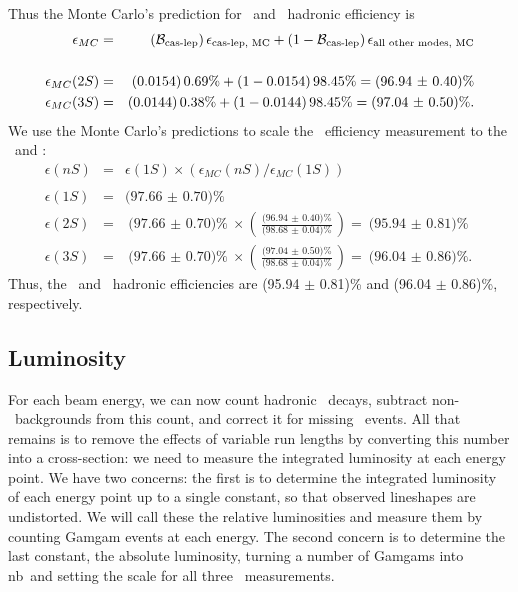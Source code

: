 \documentclass[aps,prd,preprint,superscriptaddress,tightenlines,nofootinbib,floatfix]{revtex4}
\begin{document}
Thus the Monte Carlo's prediction for \utwo\ and \uthree\ hadronic
efficiency is
\begin{eqnarray}
  \epsilon_{MC} &=& (\mathcal{B}_{\mbox{\scriptsize cas-lep}}) \, \epsilon_{\mbox{\scriptsize cas-lep, MC}}
  + (1 - \mathcal{B}_{\mbox{\scriptsize cas-lep}}) \, \epsilon_{\mbox{\scriptsize all other modes, MC}} \\
  & & \nonumber \\
  \epsilon_{MC}(2S) &=& (0.0154) \, 0.69\% + (1 - 0.0154) \, 98.45\% = \mbox{(96.94 $\pm$ 0.40)\%} \nonumber \\
  \epsilon_{MC}(3S) &=& (0.0144) \, 0.38\% + (1 - 0.0144) \, 98.45\% = \mbox{(97.04 $\pm$ 0.50)\%.} \nonumber
\end{eqnarray}
We use the Monte Carlo's predictions to scale the \uone\ efficiency
measurement to the \utwo\ and \uthree:
\begin{eqnarray}
  \epsilon(nS) &=& \epsilon(1S) \times \left(\epsilon_{MC}(nS) / \epsilon_{MC}(1S)\right) \\
  & & \nonumber \\
  \epsilon(1S) &=& \mbox{(97.66 $\pm$ 0.70)\%} \nonumber \\
  \epsilon(2S) &=& \mbox{(97.66 $\pm$ 0.70)\%} \times \left(\frac{\mbox{(96.94 $\pm$ 0.40)\%}}{\mbox{(98.68 $\pm$ 0.04)\%}}\right) = \mbox{(95.94 $\pm$ 0.81)\%} \nonumber \\
  \epsilon(3S) &=& \mbox{(97.66 $\pm$ 0.70)\%} \times \left(\frac{\mbox{(97.04 $\pm$ 0.50)\%}}{\mbox{(98.68 $\pm$ 0.04)\%}}\right) = \mbox{(96.04 $\pm$ 0.86)\%.} \nonumber
\end{eqnarray}
Thus, the \utwo\ and \uthree\ hadronic efficiencies are (95.94 $\pm$
0.81)\% and (96.04 $\pm$ 0.86)\%, respectively.

%
\subsection{Luminosity}
%

For each beam energy, we can now count hadronic \ups\ decays, subtract
non-\ups\ backgrounds from this count, and correct it for missing
\ups\ events.  All that remains is to remove the effects of variable
run lengths by converting this number into a cross-section: we need to
measure the integrated luminosity at each energy point.  We have two
concerns: the first is to determine the integrated luminosity of each
energy point up to a single constant, so that observed lineshapes are
undistorted.  We will call these the relative luminosities and measure
them by counting Gamgam events at each energy.  The second concern is
to determine the last constant, the absolute luminosity, turning a
number of Gamgams into nb\inv\ and setting the scale for all three
\gee\ measurements.
\end{document}
